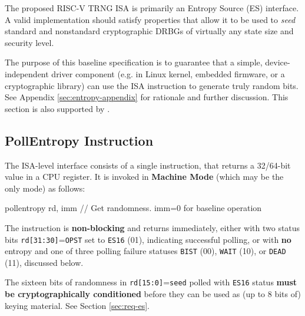 \label{sec:entropy-source}

    The proposed RISC-V TRNG ISA is primarily an Entropy Source (ES)
    interface. A valid implementation should satisfy properties that allow
    it to be used to \emph{seed} standard and nonstandard cryptographic
    DRBGs of virtually any state size and security level.

    The purpose of this baseline specification is to guarantee that a simple,
    device-independent driver component (e.g. in Linux kernel, embedded
    firmware, or a cryptographic library) can use the ISA instruction to
    generate truly random bits. See Appendix \ref{sec:entropy-appendix} for
    rationale and further discussion. This section is also supported by
    \cite{SaNeMa20}.

\subsection{PollEntropy Instruction}
\label{sec:es-pollentropy}

    The ISA-level interface consists of a single instruction,
     that returns a 32/64-bit value in a CPU register.
    It is invoked in {\bf Machine Mode} (which may be the only mode) as
    follows:

\begin{cryptoisa}
pollentropy      rd, imm          // Get randomness. imm=0 for baseline operation
\end{cryptoisa}


    The instruction is {\bf non-blocking} and returns immediately, either
    with two status bits \verb|rd[31:30]|=\verb|OPST| set to
    \verb|ES16| (01), indicating successful polling, or with {\bf no}
    entropy and one of three polling failure statuses \verb|BIST| (00),
    \verb|WAIT| (10), or \verb|DEAD| (11), discussed below.

    The sixteen bits of randomness in \verb|rd[15:0]|=\verb|seed| polled
    with \verb|ES16| status {\bf must be cryptographically conditioned}
    before they can be used as (up to 8 bits of) keying material. See Section
    \ref{sec:req-es}.


